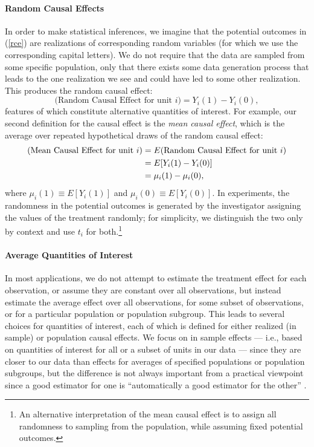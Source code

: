 \documentclass[11pt,titlepage]{article}
\begin{document}
\paragraph{Random Causal Effects} In order to make statistical
inferences, we imagine that the potential outcomes in (\ref{rce}) are
realizations of corresponding random variables (for which we use the
corresponding capital letters).  We do not require that the data are
sampled from some specific population, only that there exists some
data generation process that leads to the one realization we see and
could have led to some other realization.  This produces the random
causal effect:
\begin{equation}
  \label{rance}
  \text{(Random Causal Effect for unit $i$)}  = Y_i(1) - Y_i(0),
\end{equation}
features of which constitute alternative quantities of interest.  For
example, our second definition for the causal effect is the \emph{mean
  causal effect}, which is the average over repeated hypothetical
draws of the random causal effect:
\begin{align}
  \label{meance} \text{(Mean Causal Effect for unit $i$)}
  &= E(\text{Random Causal Effect for unit $i$})\\
  &= E[Y_i(1) - Y_i(0)]\\ \notag &= \mu_i(1) - \mu_i(0),
\end{align}
where $\mu_i(1)\equiv E[Y_i(1)]$ and $\mu_i(0)\equiv E[Y_i(0)]$.  In
experiments, the randomness in the potential outcomes is generated by
the investigator assigning the values of the treatment randomly; for
simplicity, we distinguish the two only by context and use $t_i$ for
both.\footnote{An alternative interpretation of the mean causal effect
  is to assign all randomness to sampling from the population, while
  assuming fixed potential outcomes.}

\paragraph{Average Quantities of Interest}
In most applications, we do not attempt to estimate the treatment
effect for each observation, or assume they are constant over all
observations, but instead estimate the average effect over all
observations, for some subset of observations, or for a particular
population or population subgroup.  This leads to several choices for
quantities of interest, each of which is defined for either realized
(in sample) or population causal effects.  We focus on in sample
effects --- i.e., based on quantities of interest for all or a subset
of units in our data --- since they are closer to our data than
effects for averages of specified populations or population subgroups,
but the difference is not always important from a practical viewpoint
since a good estimator for one is ``automatically a good estimator for
the other'' \citep[p.6]{Imbens04}.
\end{document}
